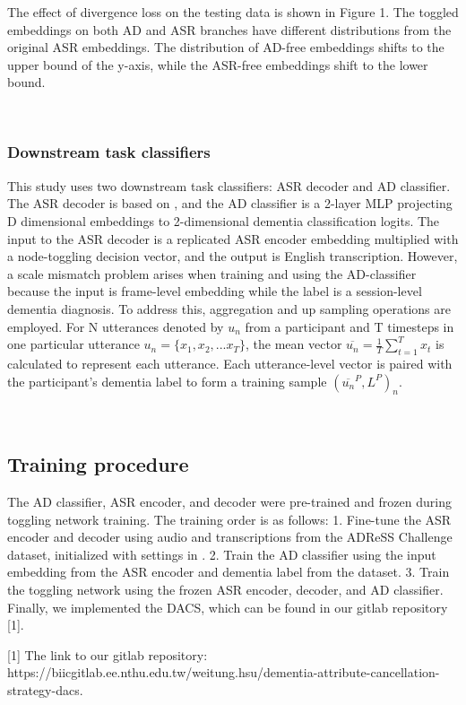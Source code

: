 The effect of divergence loss on the testing data is shown in Figure 1. The toggled embeddings on both AD and ASR branches have different distributions from the original ASR embeddings. The distribution of AD-free embeddings shifts to the upper bound of the y-axis, while the ASR-free embeddings shift to the lower bound.

\
\subsubsection{Downstream task classifiers}

This study uses two downstream task classifiers: ASR decoder and AD classifier. The ASR decoder is based on \cite{baevski2022data2vec}, and the AD classifier is a 2-layer MLP projecting D dimensional embeddings to 2-dimensional dementia classification logits. The input to the ASR decoder is a replicated ASR encoder embedding multiplied with a node-toggling decision vector, and the output is English transcription. However, a scale mismatch problem arises when training and using the AD-classifier because the input is frame-level embedding while the label is a session-level dementia diagnosis. To address this, aggregation and up sampling operations are employed. For N utterances denoted by $u_{n}$ from a participant and T timesteps in one particular utterance $u_{n} = \{x_{1},x_{2},...x_{T}\}$, the mean vector $\overline{u_{n}}=\frac{1}{T}\sum_{t=1}^{T}{x_{t}}$ is calculated to represent each utterance. Each utterance-level vector is paired with the participant's dementia label to form a training sample $(\overline{u_{n}}^{P}, L^{P})_{n}$.

\
\subsection{Training procedure}

The AD classifier, ASR encoder, and decoder were pre-trained and frozen during toggling network training. The training order is as follows:  
1. Fine-tune the ASR encoder and decoder using audio and transcriptions from the ADReSS Challenge dataset, initialized with settings in \cite{baevski2022data2vec}.  
2. Train the AD classifier using the input embedding from the ASR encoder and dementia label from the dataset.  
3. Train the toggling network using the frozen ASR encoder, decoder, and AD classifier.  
Finally, we implemented the DACS, which can be found in our gitlab repository [1].  

[1] The link to our gitlab repository: https://biicgitlab.ee.nthu.edu.tw/weitung.hsu/dementia-attribute-cancellation-strategy-dacs.


